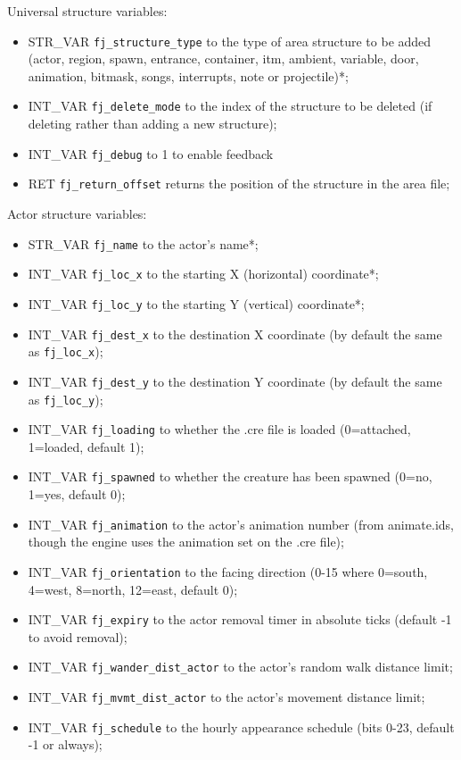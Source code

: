 \documentclass{article}
\begin{document}
Universal structure variables:
\begin{itemize}
\item STR_VAR \verb+fj_structure_type+ to the type of area structure to be added (actor, region, spawn, entrance, container, itm, ambient, variable, door, animation, bitmask, songs, interrupts, note or projectile)*;
\item INT_VAR \verb+fj_delete_mode+ to the index of the structure to be deleted (if deleting rather than adding a new structure);
\item INT_VAR \verb+fj_debug+ to 1 to enable feedback
\item RET \verb+fj_return_offset+ returns the position of the structure in the area file;
\end{itemize}
Actor structure variables:
\begin{itemize}
\item STR_VAR \verb+fj_name+ to the actor's name*;
\item INT_VAR \verb+fj_loc_x+ to the starting X (horizontal) coordinate*;
\item INT_VAR \verb+fj_loc_y+ to the starting Y (vertical) coordinate*;
\item INT_VAR \verb+fj_dest_x+ to the destination X coordinate (by default the same as \verb+fj_loc_x+);
\item INT_VAR \verb+fj_dest_y+ to the destination Y coordinate (by default the same as \verb+fj_loc_y+);
\item INT_VAR \verb+fj_loading+ to whether the .cre file is loaded (0=attached, 1=loaded, default 1);
\item INT_VAR \verb+fj_spawned+ to whether the creature has been spawned (0=no, 1=yes, default 0);
\item INT_VAR \verb+fj_animation+ to the actor's animation number (from animate.ids, though the engine uses the animation set on the .cre file);
\item INT_VAR \verb+fj_orientation+ to the facing direction (0-15 where 0=south, 4=west, 8=north, 12=east, default 0);
\item INT_VAR \verb+fj_expiry+ to the actor removal timer in absolute ticks (default -1 to avoid removal);
\item INT_VAR \verb+fj_wander_dist_actor+ to the actor's random walk distance limit;
\item INT_VAR \verb+fj_mvmt_dist_actor+ to the actor's movement distance limit;
\item INT_VAR \verb+fj_schedule+ to the hourly appearance schedule (bits 0-23, default -1 or always);

\end{itemize}
\end{document}
